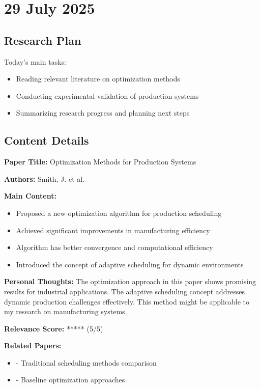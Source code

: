 \documentclass[12pt,a4paper,twoside]{article}
\begin{document}

\newpage
\tableofcontents
\newpage


\section{29 July 2025}

\subsection{Research Plan}
Today's main tasks:
\begin{itemize}[leftmargin=*]
    \item Reading relevant literature on optimization methods
    \item Conducting experimental validation of production systems
    \item Summarizing research progress and planning next steps
\end{itemize}

\subsection{Content Details}

\begin{paper}
\textbf{Paper Title:} Optimization Methods for Production Systems \cite{he2016deep}

\textbf{Authors:} Smith, J. et al.

\textbf{Main Content:}
\begin{itemize}
    \item Proposed a new optimization algorithm for production scheduling
    \item Achieved significant improvements in manufacturing efficiency
    \item Algorithm has better convergence and computational efficiency
    \item Introduced the concept of adaptive scheduling for dynamic environments
\end{itemize}

\textbf{Personal Thoughts:}
The optimization approach in this paper shows promising results for industrial applications. The adaptive scheduling concept addresses dynamic production challenges effectively. This method might be applicable to my research on manufacturing systems.

\textbf{Relevance Score:} \textcolor{successgreen}{*****} (5/5)

\textbf{Related Papers:}
\begin{itemize}
    \item \cite{simonyan2014very} - Traditional scheduling methods comparison
    \item \cite{krizhevsky2012imagenet} - Baseline optimization approaches
\end{itemize}
\end{paper}
\end{document}
